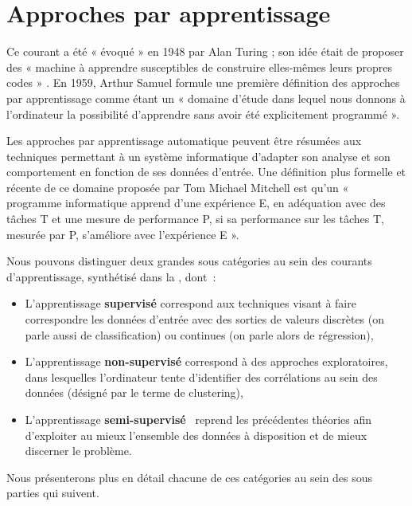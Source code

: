 \section{Approches par apprentissage}
\label{sec:machine_learning}
Ce courant a été « évoqué » en 1948 par Alan Turing ; son idée était de proposer des « machine à apprendre susceptibles de construire elles-mêmes leurs propres codes » \cite{Turing1950}. En 1959, Arthur Samuel formule une première définition des approches par apprentissage comme étant un « domaine d’étude dans lequel nous donnons à l’ordinateur la possibilité d’apprendre sans avoir été explicitement programmé ».\par 

Les approches par apprentissage automatique peuvent être résumées aux techniques permettant à un système informatique d’adapter son analyse et son comportement en fonction de ses données d’entrée. Une définition plus formelle et récente de ce domaine proposée par Tom Michael Mitchell est qu’un « programme informatique apprend d’une expérience E, en adéquation avec des tâches T et une mesure de performance P, si sa performance sur les tâches T, mesurée par P, s’améliore avec l’expérience E ».\par

Nous pouvons distinguer deux grandes sous catégories au sein des courants d’apprentissage, synthétisé dans la , dont~: 
\begin{itemize}
    \item L'apprentissage \textbf{supervisé} correspond aux techniques visant à faire correspondre les données d'entrée avec des sorties de valeurs discrètes (on parle aussi de classification) ou continues (on parle alors de régression),
    \item L'apprentissage \textbf{non-supervisé} correspond à des approches exploratoires, dans lesquelles l'ordinateur tente d'identifier des corrélations au sein des données (désigné par le terme de clustering),
    \item L'apprentissage \textbf{semi-supervisé}~\cite{Murphy2012} reprend les précédentes théories afin d'exploiter au mieux l'ensemble des données à disposition et de mieux discerner le problème.
\end{itemize}

Nous présenterons plus en détail chacune de ces catégories au sein des sous parties qui suivent.
 
